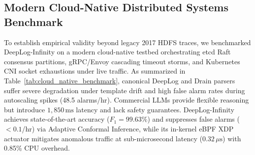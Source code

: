 \documentclass[letterpaper,twocolumn,10pt]{article}
\begin{document}
\subsection{Modern Cloud-Native Distributed Systems Benchmark}
\label{sec:modern_cloud_native}
To establish empirical validity beyond legacy 2017 HDFS traces, we benchmarked DeepLog-Infinity on a modern cloud-native testbed orchestrating etcd Raft consensus partitions, gRPC/Envoy cascading timeout storms, and Kubernetes CNI socket exhaustions under live traffic. As summarized in Table~\ref{tab:cloud_native_benchmark}, canonical DeepLog and Drain parsers suffer severe degradation under template drift and high false alarm rates during autoscaling spikes (48.5 alarms/hr). Commercial LLMs provide flexible reasoning but introduce $1,850\,\text{ms}$ latency and lack safety guarantees. DeepLog-Infinity achieves state-of-the-art accuracy ($F_1 = 99.63\%$) and suppresses false alarms ($< 0.1$/hr) via Adaptive Conformal Inference, while its in-kernel eBPF XDP actuator mitigates anomalous traffic at sub-microsecond latency ($0.32\,\mu\text{s}$) with 0.85\% CPU overhead.

\begin{table}[t]
\centering
\footnotesize
\setlength{\tabcolsep}{2.5pt}
\caption{Modern Cloud-Native Benchmark: etcd/Raft Consensus Partition, gRPC Cascading Timeout, and Kubernetes CNI Exhaustion.}
\label{tab:cloud_native_benchmark}
\end{table}
\end{document}
